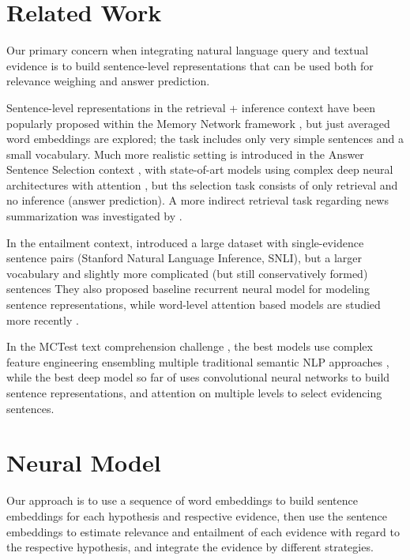 \documentclass[11pt]{article}
\begin{document}
\section{Related Work}
\label{sec:relwork}

Our primary concern when integrating natural language query and
textual evidence is to build sentence-level representations that
can be used both for relevance weighing and answer prediction.

Sentence-level representations in the retrieval + inference context have been
popularly proposed within the Memory Network framework \cite{MemNN},
but just averaged word embeddings are explored; the task includes
only very simple sentences and a small vocabulary.
Much more realistic setting is introduced in the Answer Sentence Selection
context \cite{AnsselWang} \cite{sps}, with state-of-art models using complex
deep neural architectures with attention \cite{attnpooling}, but ths selection
task consists of only retrieval and no inference (answer prediction).
A more indirect retrieval task regarding news summarization was investigated
by \cite{AttSum}.

In the entailment context, \cite{SNLI} introduced a large dataset
with single-evidence sentence pairs (Stanford Natural Language Inference, SNLI),
but a larger vocabulary and
slightly more complicated (but still conservatively formed) sentences
They also proposed baseline recurrent neural model for modeling
sentence representations, while word-level attention based models
are studied more recently \cite{SNLIattn} \cite{LSTMMR}.


In the MCTest text comprehension challenge \cite{MCTest}, the
best models use complex feature engineering ensembling multiple traditional
semantic NLP approaches \cite{MCWang}, while the best deep model so far
of \cite{HABCNN} uses convolutional neural networks to build sentence
representations, and attention on multiple levels to select evidencing
sentences.

\section{Neural Model}
\label{sec:model}

Our approach is to use a sequence of word embeddings to build
sentence embeddings for each hypothesis and respective evidence,
then use the sentence embeddings to estimate relevance and
entailment of each evidence with regard to the respective
hypothesis, and integrate the evidence by different strategies.
\end{document}
